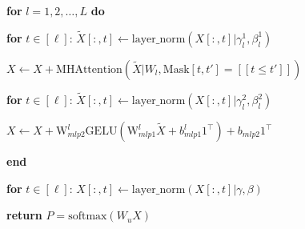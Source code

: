 \documentclass{article}
\begin{document}
\textbf{for} $l = 1, 2, \dots, L$ \textbf{do}

\quad \textbf{for} $t \in [\ell]$: $\tilde{X}[:,t] \leftarrow \text{layer\_norm}(X[:,t]|\gamma_{l}^{1},\beta_{l}^{1})$

\quad $X \leftarrow X + \text{MHAttention}(\tilde{X}|W_l,\text{Mask}[t,t'] = [[t \leq t']])$

\quad \textbf{for} $t \in [\ell]$: $\tilde{X}[:,t] \leftarrow \text{layer\_norm}(X[:,t]|\gamma_{l}^{2},\beta_{l}^{2})$

\quad $X \leftarrow X + \text{W}^{l}_{mlp2}\text{GELU}(\text{W}^{l}_{mlp1}\tilde{X} + b_{mlp1}^l1^{\top}) + b_{mlp2}1^{\top}$

\textbf{end}

\textbf{for} $t \in [\ell]$: $X[:,t] \leftarrow \text{layer\_norm}(X[:,t]|\gamma,\beta)$

\textbf{return} $P = \text{softmax}(W_uX)$
\end{document}
